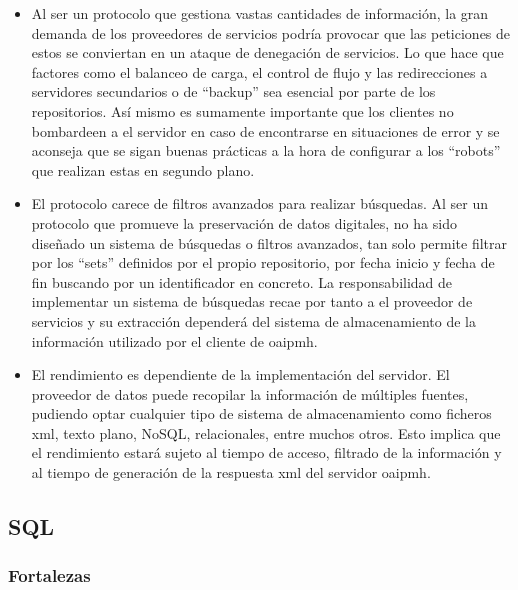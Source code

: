 \begin{itemize}
	\item Al ser un protocolo que gestiona vastas cantidades de información, la gran demanda de los proveedores de servicios podría provocar que las peticiones de estos se conviertan en un ataque de denegación de servicios. Lo que hace que factores como el balanceo de carga, el control de flujo y las redirecciones a servidores secundarios o de ``backup'' sea  esencial por parte de los repositorios. Así mismo es sumamente importante que los clientes no bombardeen a el servidor en caso de encontrarse en situaciones de error y se aconseja que se sigan buenas prácticas a la hora de configurar a los ``robots'' que realizan estas en segundo plano.

	\item El protocolo carece de filtros avanzados para realizar búsquedas. Al ser un protocolo que promueve la preservación de datos digitales, no ha sido diseñado un sistema de búsquedas o filtros avanzados, tan solo permite filtrar por los ``sets'' definidos por el propio repositorio, por fecha inicio y fecha de fin buscando por un identificador en concreto. La responsabilidad de implementar un sistema de búsquedas recae por tanto a el proveedor de servicios y su extracción dependerá del sistema de almacenamiento de la información utilizado por el cliente de \acrshort{oaipmh}.

	\item El rendimiento es dependiente de la implementación del servidor. El proveedor de datos puede recopilar la información de múltiples fuentes, pudiendo optar cualquier tipo de sistema de almacenamiento como ficheros \acrshort{xml}, texto plano, NoSQL\cite{NoSQL},  relacionales, entre muchos otros. Esto implica que el rendimiento estará sujeto al tiempo de acceso, filtrado de la información y al tiempo de generación de la respuesta \acrshort{xml} del servidor \acrshort{oaipmh}.
\end{itemize}

\subsection{SQL}

\subsubsection{Fortalezas}

